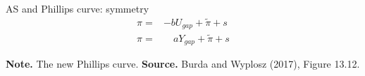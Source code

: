 \documentclass{beamer}
\begin{document}
\begin{frame}{AS and Phillips curve: symmetry}
\begin{align}
  \pi =& -b U_{gap} + \tilde{\pi} + s \tag{Phillips Curve}\\
\pi =& \quad a Y_{gap} + \tilde{\pi} + s \tag{AS}
\end{align}
  \begin{center}
\begin{figure}[h!]
\end{figure}
\begin{minipage}{0.90\columnwidth}
\tiny	
\textbf{Note.} The new Phillips curve. \textbf{Source.} Burda and Wyplosz (2017), Figure 13.12.\\
\end{minipage}
\end{center}
\end{frame}
\end{document}
